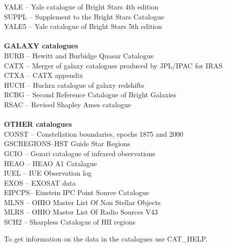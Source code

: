 \begin{tabbing}
\>YALE \>-- \>Yale catalogue of Bright Stars 4th edition\\
\>SUPPL \>-- \>Supplement to the Bright Stars Catalogue\\
\>YALE5 \>-- \>Yale catalogue of Bright Stars 5th edition\\
\\
{\bf \Large \hspace{-0.4in}
GALAXY catalogues}\\
\>BURB \>-- \>Hewitt and Burbidge Quasar Catalogue\\
\>CATX \>-- \>Merger of galaxy catalogues produced by JPL/IPAC for IRAS\\
\>CTXA \>-- \>CATX appendix\\
\>HUCH \>-- \>Huchra catalogue of galaxy redshifts\\
\>RCBG \>-- \>Second Reference Catalogue of Bright Galaxies\\
\>RSAC \>-- \>Revised Shapley Ames catalogue\\
\\
{\bf \Large \hspace{-0.4in}
OTHER catalogues}\\
\>CONST \>-- \>Constellation boundaries, epochs 1875 and 2000\\
\>GSCREGIONS\>--\>HST Guide Star Regions\\
\>GCIO \>-- \>Gezari catalogue of infrared observations\\
\>HEAO \>-- \>HEAO A1 Catalague\\
\>IUEL \>-- \>IUE Observation log\\
\>EXOS \>-- \>EXOSAT data\\
\>EIPCPS\>-- \>Einstein IPC Point Source Catalogue\\
\>MLNS \>-- \>OHIO Master List Of Non Stellar Objects\\
\>MLRS \>-- \>OHIO Master List Of Radio Sources  V43\\
\>SCH2 \>-- \>Sharpless Catalogue of HII regions\\
\end{tabbing}
To get information on the data in the catalogues use CAT\_HELP.


